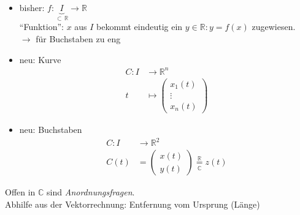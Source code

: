 \begin{note}[Achtung!]\flush

  \begin{itemize}
    \item bisher: $f: \underbrace{I}_{\subset \, \mathbb{R}} \longrightarrow \mathbb{R}$ \\
      ``Funktion'': $x$ aus $I$ bekommt eindeutig ein $y\in \mathbb{R}: y=f(x)$ zugewiesen.\\
      $\rightarrow$ für Buchstaben zu eng
    \item neu: Kurve
      \begin{align*}
      C:I & \longrightarrow \mathbb{R}^n \\
      t & \longmapsto \begin{pmatrix}x_1(t) \\ \vdots \\ x_n(t)\end{pmatrix}
      \end{align*}
    \item neu: Buchstaben
      \begin{align*}
      C:I & \longrightarrow \mathbb{R}^2 \\
      C(t) & = \begin{pmatrix}x(t) \\ y(t)\end{pmatrix} \underset{\mathbb{C}}{\overset{\mathbb{R}}{=}} z(t)
      \end{align*}
  \end{itemize}

\end{note}
%
\noindent Offen in $\mathbb{C}$ sind  \emph{Anordnungsfragen}.\\
Abhilfe aus der Vektorrechnung: Entfernung vom Ursprung (Länge)

